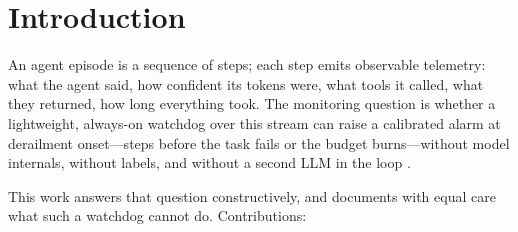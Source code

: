 \documentclass{article}
\begin{document}
\begin{abstract}
one-class monitor structurally cannot be scored. A third check validates tool results against the shapes their tool can return, flagging \textbf{0 of 1825} healthy episodes while catching 46\% of injected context corruption, 215 of 218 within one step of onset. Detection is then closed into \textbf{repair}: each flagged run is rolled back to its last fact-gathering step and re-run live, recovering \textbf{45\%} of failures against a 16\% resampling control ($p=0.0005$) and lifting net task success from \textbf{52\% to 73\%} for about one extra model call per run. The monitor scores a step in $\sim$200 $\mu$s and the telemetry adapter that feeds it adds a median 674 $\mu$s, so the whole path stays under a millisecond per step --- against one 7B forward pass for an auditor that judges every step.
\end{abstract}

\section{Introduction}

An agent episode is a sequence of steps; each step emits observable telemetry: what the agent said, how confident its tokens were, what tools it called, what they returned, how long everything took. The monitoring question is whether a lightweight, always-on watchdog over this stream can raise a calibrated alarm at derailment onset---steps before the task fails or the budget burns---without model internals, without labels, and without a second LLM in the loop \cite{zheng2023judging}.

This work answers that question constructively, and documents with equal care what such a watchdog cannot do. Contributions:
\end{document}
